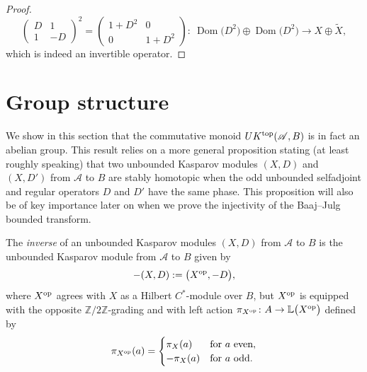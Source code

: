 \documentclass[pdftex]{sigma}
\numberwithin{equation}{section}
\newcommand{\op}{\oplus}
\newcommand{\zz}{\mathbb{Z}}
\newcommand{\s}[1]{\mathscr{#1}}
\newcommand{\B}[1]{\mathbb{#1}}
\newcommand{\wit}{\widetilde}
\newcommand\sA{\mathscr{A}}
\begin{document}
\begin{proof}
\[
\left(\begin{matrix} D & 1 \\ 1 & - D\end{matrix}\right)^2 = \left(\begin{matrix} 1 + D^2 & 0 \\ 0 & 1 + D^2 \end{matrix}\right)\colon \ \operatorname{Dom}\big(D^2\big) \op \operatorname{Dom}\big(D^2\big) \to X \op \wit{X} ,
\]
which is indeed an invertible operator.
\end{proof}

\section{Group structure}\label{s:group}
We show in this section that the commutative monoid $UK^{{\rm top}}(\sA,B)$ is in fact an abelian group. This result relies on a more general proposition stating (at least roughly speaking) that two unbounded Kasparov modules $(X,D)$ and $(X,D')$ from $\s A$ to $B$ are stably homotopic when the odd unbounded selfadjoint and regular operators $D$ and $D'$ have the same phase. This proposition will also be of key importance later on when we prove the injectivity of the Baaj--Julg bounded transform.

\begin{dfn}\label{d:inv}The \emph{inverse} of an unbounded Kasparov modules $(X,D)$ from $\s A$ to $B$ is the unbounded Kasparov module from $\s A$ to $B$ given by
\[
-(X,D) := \big( X^{{\rm op}},-D\big) ,
\]
where $X^{{\rm op}}$ agrees with $X$ as a Hilbert $C^*$-module over $B$, but $X^{{\rm op}}$ is equipped with the opposite $\zz/2\zz$-grading and with left action $\pi_{X^{{\rm op}}}\colon A \to \B L\big(X^{{\rm op}}\big)$ defined by
\[
\pi_{X^{{\rm op}}}(a) = \begin{cases} \pi_X(a) & \mbox{for} \ a \mbox{ even}, \\ -\pi_X(a) & \mbox{for} \ a \mbox{ odd}.\end{cases}
\]
\end{dfn}
\end{document}
